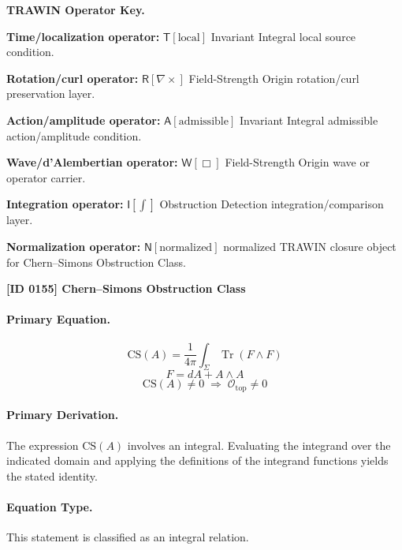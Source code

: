 \par\vspace{0.45\baselineskip}
\noindent\begin{minipage}[t]{\linewidth}
\begingroup
\small
\raggedright
\textbf{TRAWIN Operator Key.}\par
\noindent\textbf{Time/localization operator:} $\mathsf{T}\!\left[\mathrm{local}\right]$ Invariant Integral local source condition.\par
\noindent\textbf{Rotation/curl operator:} $\mathsf{R}\!\left[\nabla\times\right]$ Field-Strength Origin rotation/curl preservation layer.\par
\noindent\textbf{Action/amplitude operator:} $\mathsf{A}\!\left[\mathrm{admissible}\right]$ Invariant Integral admissible action/amplitude condition.\par
\noindent\textbf{Wave/d'Alembertian operator:} $\mathsf{W}\!\left[\Box\right]$ Field-Strength Origin wave or operator carrier.\par
\noindent\textbf{Integration operator:} $\mathsf{I}\!\left[\int\right]$ Obstruction Detection integration/comparison layer.\par
\noindent\textbf{Normalization operator:} $\mathsf{N}\!\left[\mathrm{normalized}\right]$ normalized TRAWIN closure object for Chern--Simons Obstruction Class.\par
\endgroup
\end{minipage}

\clearpage
\noindent\textbf{[ID 0155] Chern--Simons Obstruction Class}\par
\vspace{0.35em}
\paragraph{Primary Equation.}
\[
\mathrm{CS}(A)
=
\frac{1}{4\pi}\int_{\Sigma}\operatorname{Tr}(F\wedge F)
\]
\[
F=dA+A\wedge A
\]
\[
\mathrm{CS}(A)\neq 0
\;\Longrightarrow\;
\mathcal{O}_{\mathrm{top}}\neq 0
\]

\paragraph{Primary Derivation.}
The expression \( \mathrm{CS}(A) \) involves an integral. Evaluating the integrand over the indicated domain and applying the definitions of the integrand functions yields the stated identity.
\paragraph{Equation Type.}
This statement is classified as an integral relation.

